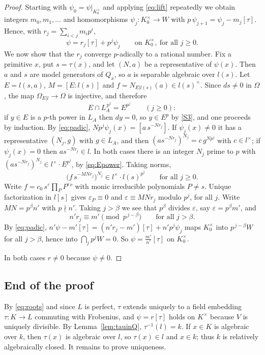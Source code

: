 \documentclass[11pt]{amsart}
\theoremstyle{definition}
\theoremstyle{remark}
\begin{document}
\begin{proof}
Starting with $\psi_0=\psi|_{K_0^\times}$ and applying \eqref{eq:lift} repeatedly we obtain integers $m_0,m_1,\dots$ and homomorphisms $\psi_j\colon K_0^\times\to W$ with $p\,\psi_{j+1}=\psi_j-m_j[\tau]$. Hence, with $r_j=\sum_{i<j}m_ip^i$,
\begin{equation}\label{eq:padic}
\psi=r_j[\tau]+p^j\psi_j\qquad\text{on }K_0^\times,\ \text{for all }j\ge0 .
\end{equation}
We now show that the $r_j$ converge $p$-adically to a rational number. Fix a primitive $x$, put $s=\tau(x)$, and let $(N,a)$ be a representative of $\psi(x)$. Then $a$ and $s$ are model generators of $Q_x$, so $a$ is separable algebraic over $l(s)$.
Let $E=l(s,a)$, $M=[E:l(s)]$ and $f=N_{E|l(s)}(a)\in l(s)^\times$. Since $ds\ne0$ in $\Omega$, the map $\Omega_{E|l}\to\Omega$ is injective, and therefore
\begin{equation}\label{eq:Epower}
E\cap L_A^{\,p^j}=E^{p^j}\qquad(j\ge0):
\end{equation}
if $y\in E$ is a $p$-th power in $L_A$ then $dy=0$, so $y\in E^p$ by \ref{S3}, and one proceeds by induction.
By \eqref{eq:padic}, $N p^j\psi_j(x)=[a\,s^{-Nr_j}]$. If $\psi_j(x)\neq0$ it has a representative $(N_j,g)$ with $g\in L_A$, and then $(as^{-Nr_j})^{N_j}=c\,g^{Np^j}$ with $c\in l^\times$; if $\psi_j(x)=0$ then $as^{-Nr_j}\in l$.
In both cases there is an integer $N_j$ prime to $p$ with $(as^{-Nr_j})^{N_j}\in l^\times\cdot E^{p^j}$, by \eqref{eq:Epower}. Taking norms,
\[ \bigl(f\,s^{-MNr_j}\bigr)^{N_j}\in l^\times\cdot l(s)^{p^j}\qquad\text{for all }j\geq0. \]
Write $f=c_0\,s^{\varepsilon}\prod_PP^{\varepsilon_P}$ with monic irreducible polynomials $P\neq s$. Unique factorization in $l[s]$ gives $\varepsilon_P\equiv0$ and $\varepsilon\equiv MNr_j$ modulo $p^j$, for all $j$.
Write $MN=p^\beta n'$ with $p\nmid n'$. Taking $j>\beta$ we see that $p^\beta$ divides $\varepsilon$, say $\varepsilon=p^\beta m'$, and
\[ n'r_j\equiv m'\pmod{p^{\,j-\beta}}\qquad\text{for all }j>\beta. \]
By \eqref{eq:padic}, $n'\psi-m'[\tau]=(n'r_j-m')[\tau]+n'p^j\psi_j$ maps $K_0^\times$ into $p^{\,j-\beta}W$ for all $j>\beta$, hence into $\bigcap_jp^jW=0$. So $\psi=\frac{m'}{n'}[\tau]$ on $K_0^\times$.

In both cases $r\ne0$ because $\psi\ne0$.
\end{proof}

\subsection{End of the proof}
By \eqref{eq:roots} and since $L$ is perfect, $\tau$ extends uniquely to a field embedding $\tau\colon K\to L$ commuting with Frobenius, and $\psi=r[\tau]$ holds on $K^\times$ because $V$ is uniquely divisible.
By Lemma~\ref{lem:tauinQ}, $\tau^{-1}(l)=k$. If $x\in K$ is algebraic over $k$, then $\tau(x)$ is algebraic over $l$, so $\tau(x)\in l$ and $x\in k$; thus $k$ is relatively algebraically closed.
It remains to prove uniqueness.
\end{document}
